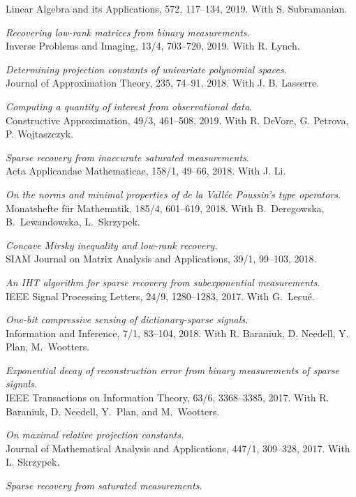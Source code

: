 \documentclass[11pt]{article}
\begin{document}
Linear Algebra and its Applications, 572, 117--134, 2019. With S. Subramanian.
\item {\sl Recovering low-rank matrices from binary measurements}.\\
Inverse Problems and Imaging, 13/4, 703--720, 2019. 
With R. Lynch. 
\item {\sl Determining projection constants of univariate polynomial spaces}.\\
Journal of Approximation Theory, 235, 74--91, 2018.
With J. B. Lasserre.
\item {\sl Computing a quantity of interest from observational data}.\\
Constructive Approximation, 49/3, 461--508, 2019. With R. DeVore, G. Petrova, P. Wojtaszczyk.
\item {\sl Sparse recovery from inaccurate saturated measurements}.\\
Acta Applicandae Mathematicae, 158/1, 49--66, 2018. With J. Li.
\item {\sl On the norms and minimal properties of de la Vall\'ee Poussin's type operators}.\\
Monatshefte f\"ur Mathematik, 185/4, 601--619, 2018. With B.~Deregowska, B.~Lewandowska, L.~Skrzypek.
\item {\sl Concave Mirsky inequality and low-rank recovery.}\\
SIAM Journal on Matrix Analysis and Applications, 39/1, 99--103, 2018.
\item {\sl An IHT algorithm for sparse recovery from subexponential measurements}.\\
IEEE Signal Processing Letters, 24/9, 1280--1283, 2017. 
With G.~Lecu\'e.
\item {\sl One-bit compressive sensing of dictionary-sparse signals.}\\
Information and Inference, 7/1, 83--104, 2018.
With R. Baraniuk, D. Needell, Y. Plan, M.~Wootters.
\item {\sl Exponential decay of reconstruction error from binary measurements of sparse signals.}\\
IEEE Transactions on Information Theory, 63/6, 3368--3385, 2017.
With R. Baraniuk, D. Needell, Y.~Plan, and \mbox{M.~Wootters}.
\item {\sl On maximal relative projection constants.}\\
Journal of Mathematical Analysis and Applications,  447/1, 309--328, 2017.
With L. Skrzypek.
\item {\sl  Sparse recovery from saturated measurements.}\\
\end{document}
